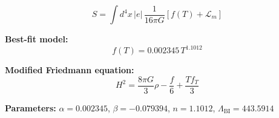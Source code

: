 
\begin{equation}
  S = \int d^4x \, |e| \, \frac{1}{16\pi G} \left[ f(T) + \mathcal{L}_m \right]
\end{equation}

\textbf{Best-fit model:}
\begin{equation}
  f(T) = 0.002345 \, T^{1.1012}
\end{equation}

\textbf{Modified Friedmann equation:}
\begin{equation}
  H^2 = \frac{8\pi G}{3} \rho - \frac{f}{6} + \frac{T f_T}{3}
\end{equation}

\textbf{Parameters:}
$\alpha = 0.002345$, \quad
$\beta = -0.079394$, \quad
$n = 1.1012$, \quad
$\Lambda_{\text{BI}} = 443.5914$